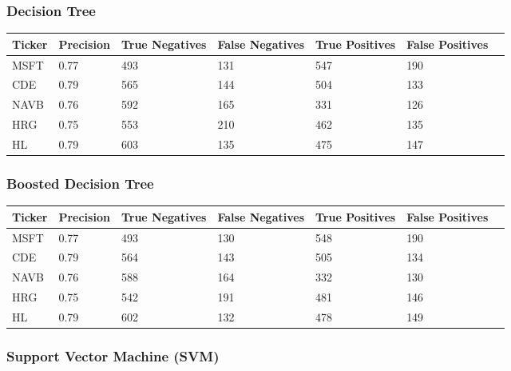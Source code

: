\subsubsection{Decision Tree}

\begin{center}
    \begin{tabular}{ | l | l | l | | l | l | l | p{5cm} |}
    \hline
    Ticker & Precision & True Negatives & False Negatives & True Positives & False Positives \\ \hline
    MSFT & 0.77 & 493 & 131 & 547 & 190 \\ \hline
    CDE & 0.79 & 565 & 144 & 504 & 133 \\ \hline
    NAVB & 0.76 & 592 & 165 & 331 & 126 \\ \hline
    HRG & 0.75 & 553 & 210 & 462 & 135 \\ \hline
    HL & 0.79 & 603 & 135 & 475 & 147 \\
    \hline
    \end{tabular}
    \label{table:nonfloat}
\end{center}

\subsubsection{Boosted Decision Tree}

\begin{center}
    \begin{tabular}{ | l | l | l | | l | l | l | p{5cm} |}
    \hline
    Ticker & Precision & True Negatives & False Negatives & True Positives & False Positives \\ \hline
    MSFT & 0.77 & 493 & 130 & 548 & 190 \\ \hline
    CDE & 0.79 & 564 & 143 & 505 & 134 \\ \hline
    NAVB & 0.76 & 588 & 164 & 332 & 130 \\ \hline
    HRG & 0.75 & 542 & 191 & 481 & 146 \\ \hline
    HL & 0.79 & 602 & 132 & 478 & 149 \\
    \hline
    \end{tabular}
    \label{table:nonfloat}
\end{center}

\subsubsection{Support Vector Machine (SVM)}

